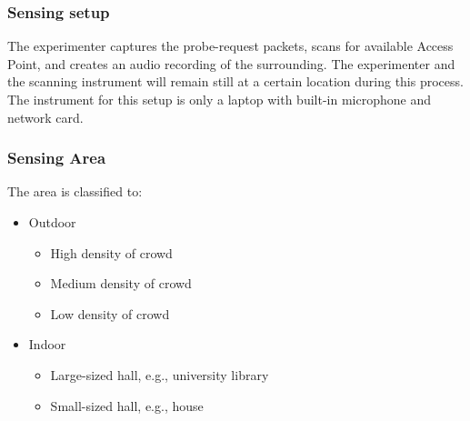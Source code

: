 \documentclass{article}
\begin{document}
\subsubsection*{Sensing setup} %
The experimenter captures the probe-request packets, scans for available Access Point, and creates an audio recording of the surrounding. The experimenter and the scanning instrument will remain still at a certain location during this process. The instrument for this setup is only a laptop with built-in microphone and network card.




\subsubsection*{Sensing Area} %
\label{ssub:sensing_area}
The area is classified to:
\begin{itemize}
	\item Outdoor %
	\begin{itemize}
		\item High density of crowd %
		\item Medium density of crowd %
		\item Low density of crowd %
	\end{itemize}
	
	\item Indoor
	\begin{itemize}
		\item Large-sized hall, e.g., university library %
		\item Small-sized hall, e.g., house %
	\end{itemize}
\end{itemize}
\end{document}
